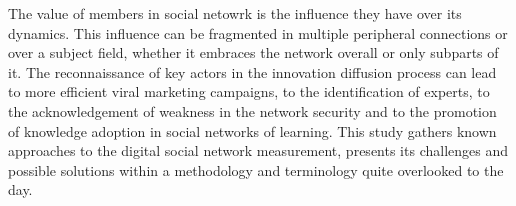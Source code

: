 The value of members in social netowrk is the influence they have over its
dynamics. This influence can be fragmented in multiple peripheral connections or
over a subject field, whether it embraces the network overall or only subparts
of it. The reconnaissance of key actors in the innovation diffusion process can
lead to more efficient viral marketing campaigns, to the identification
of experts, to the acknowledgement of weakness in the network security and to
the promotion of knowledge adoption in social networks of learning. This study
gathers known approaches to the digital social network measurement, presents its
challenges and possible solutions within a methodology and terminology quite
overlooked to the day.
